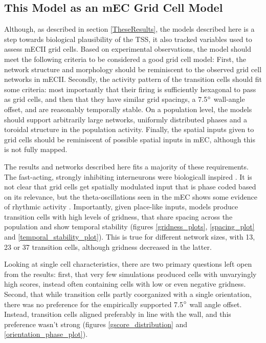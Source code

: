 \documentclass{article}
\begin{document}
    \subsection{This Model as an mEC Grid Cell Model} \label{GridCellDiscussion}

    Although, as described in section \ref{TheseResults}, the models described here is a step towards biological plausibility of the TSS, it also tracked variables used to assess mECII grid cells. Based on experimental observations, the model should meet the following criteria to be considered a good grid cell model: First, the network structure and morphology should be reminiscent to the observed grid cell networks in mECII. Secondly, the activity pattern of the transition cells should fit some criteria: most importantly that their firing is sufficiently hexagonal to pass as grid cells, and then that they have similar grid spacings, a 7.5\(\degree\) wall-angle offset, and are reasonably temporally stable. On a population level, the models should support arbitrarily large networks, uniformly distributed phases and a toroidal structure in the population activity. Finally, the spatial inputs given to grid cells should be reminiscent of possible spatial inputs in mEC, although this is not fully mapped.

    The results and networks described here fits a majority of these requirements. The fast-acting, strongly inhibiting interneurons were biologicall inspired \parencite{Couey2013,Buetfering2014}. It is not clear that grid cells get spatially modulated input that is phase coded based on its relevance, but the theta-oscillations seen in the mEC shows some evidence of rhythmic activity \parencite{Winson1978}. Importantly, given place-like inputs, models produce transition cells with high levels of gridness, that share spacing across the population and show temporal stability (figures \ref{gridness_plots}, \ref{spacing_plot} and \ref{temporal_stability_plot}). This is true for different network sizes, with 13, 23 or 37 transition cells, although gridness decreased in the latter.
    
    Looking at single cell characteristics, there are two primary questions left open from the results: first, that very few simulations produced cells with unvaryingly high scores, instead often containing cells with low or even negative gridness. Second, that while transition cells partly coorganized with a single orientation, there was no preference for the empirically supported 7.5\(\degree\) wall angle offset. Instead, transition cells aligned preferably in line with the wall, and this preference wasn't strong (figures \ref{gscore_distribution} and \ref{orientation_phase_plot}).
\end{document}
